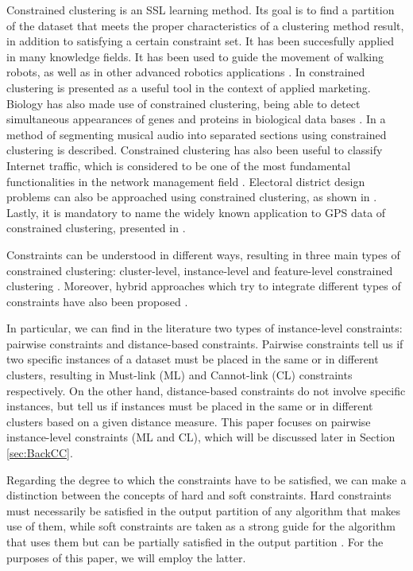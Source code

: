 \documentclass[review]{elsarticle}
\begin{document}
Constrained clustering is an SSL learning method. Its goal is to find a partition of the dataset that meets the proper characteristics of a clustering method result, in addition to satisfying a certain constraint set. It has been succesfully applied in many knowledge fields. It has been used to guide the movement of walking robots, as well as in other advanced robotics applications \cite{davidson2005clustering, semnani2016constrained}. In \cite{seret2014new} constrained clustering is presented as a useful tool in the context of applied marketing. Biology has also made use of constrained clustering, being able to detect simultaneous appearances of genes and proteins in biological data bases \cite{segal2003discovering}. In \cite{levy2008structural} a method of segmenting musical audio into separated sections using constrained clustering is described. Constrained clustering has also been useful to classify Internet traffic, which is considered to be one of the most fundamental functionalities in the network management field \cite{wang2014internet}. Electoral district design problems can also be approached using constrained clustering, as shown in \cite{brieden2017constrained}. Lastly, it is mandatory to name the widely known application to GPS data of constrained clustering, presented in \cite{wagstaff2001constrained}.

Constraints can be understood in different ways, resulting in three main types of constrained clustering: cluster-level, instance-level and feature-level constrained clustering \cite{bradley2000constrained,davidson2007survey,schmidt2011clustering}. Moreover, hybrid approaches which try to integrate different types of constraints have also been proposed \cite{wang2010clustering}. 

In particular, we can find in the literature two types of instance-level constraints: pairwise constraints and distance-based constraints. Pairwise constraints tell us if two specific instances of a dataset must be placed in the same or in different clusters, resulting in Must-link (ML) and Cannot-link (CL) constraints respectively. On the other hand, distance-based constraints do not involve specific instances, but tell us if instances must be placed in the same or in different clusters based on a given distance measure.\cite{davidson2007survey} This paper focuses on pairwise instance-level constraints (ML and CL), which will be discussed later in Section \ref{sec:BackCC}.

Regarding the degree to which the constraints have to be satisfied, we can make a distinction between the concepts of hard and soft constraints. Hard constraints must necessarily be satisfied in the output partition of any algorithm that makes use of them, while soft constraints are taken as a strong guide for the algorithm that uses them but can be partially satisfied in the output partition \cite{seret2014new, wagstaff2001constrained, law2004clustering}. For the purposes of this paper, we will employ the latter.
\end{document}
